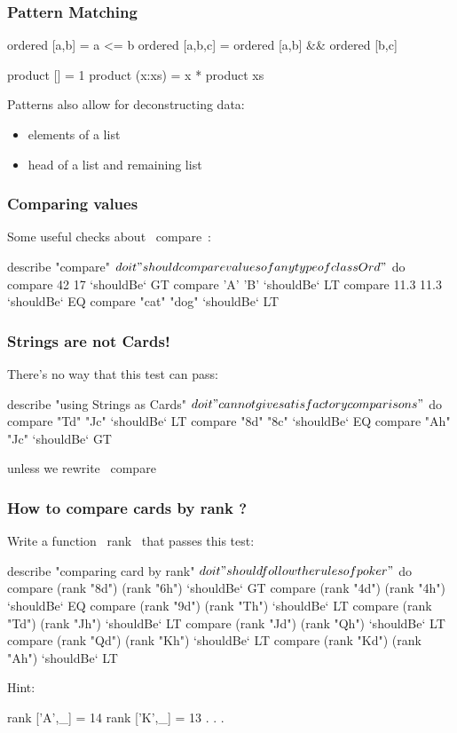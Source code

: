 \documentclass[11pt,xcolor={dvipsnames}]{beamer}
\newcommand{\vs}{\vspace{1em}}
\begin{document}
\begin{frame}[fragile]
\frametitle{Pattern Matching}
\begin{haskell}
ordered [a,b]   = a <= b
ordered [a,b,c] = ordered [a,b] && ordered [b,c]

product []     = 1
product (x:xs) = x * product xs
\end{haskell}
\vs
Patterns also allow for deconstructing data:
\begin{itemize}
\item elements of a list
\item head of a list and remaining list 
\end{itemize}
\end{frame}
\begin{frame}[fragile]
\frametitle{Comparing values}
Some useful checks about ~compare~:
\vs
\begin{hspec}
describe "compare" $ do
    it "should compare values of any type of class Ord" $ do
        compare 42 17       `shouldBe` GT
        compare 'A' 'B'     `shouldBe` LT
        compare 11.3 11.3   `shouldBe` EQ
        compare "cat" "dog" `shouldBe` LT
\end{hspec}
\end{frame}
\begin{frame}[fragile]
\frametitle{Strings are not Cards!}
There's no way that this test can pass:
\vs
\begin{hspec}
describe "using Strings as Cards" $ do
    it "cannot give satisfactory comparisons" $ do
        compare "Td" "Jc"  `shouldBe` LT
        compare "8d" "8c"  `shouldBe` EQ
        compare "Ah" "Jc"  `shouldBe` GT
\end{hspec}
\vs
unless we rewrite ~compare~ 
\end{frame}
\begin{frame}[fragile]
\frametitle{How to compare cards by rank ?}
Write a function ~rank~ that passes this test:
\vs
\begin{hspec}
describe "comparing card by rank" $ do
    it "should follow the rules of poker" $ do
        compare (rank "8d") (rank "6h") `shouldBe` GT
        compare (rank "4d") (rank "4h") `shouldBe` EQ
        compare (rank "9d") (rank "Th") `shouldBe` LT 
        compare (rank "Td") (rank "Jh") `shouldBe` LT 
        compare (rank "Jd") (rank "Qh") `shouldBe` LT 
        compare (rank "Qd") (rank "Kh") `shouldBe` LT 
        compare (rank "Kd") (rank "Ah") `shouldBe` LT 
\end{hspec}
Hint:
\begin{haskell}
rank ['A',_] = 14
rank ['K',_] = 13
    . . .
\end{haskell}
\end{frame}
\end{document}
